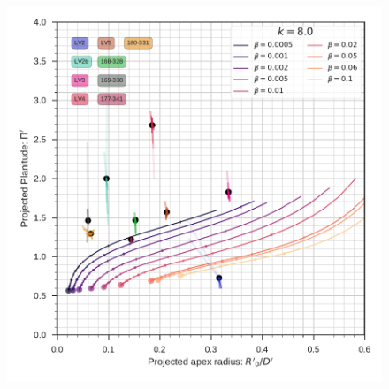 \begin{figure}
  \centering
  \ContinuedFloat
  \captionsetup{list=off, format=cont}
  \includegraphics[width=0.9\linewidth]{./Figures/obs-diagnostic-Pi-R0-k80}
  \caption{}
  \label{fig:obs-diagnostic-4}
\end{figure}



